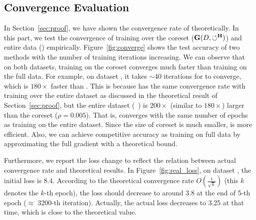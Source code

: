 \vspace{-0.5em}
\subsection{Convergence Evaluation}

In Section~\ref{sec:proof}, we have shown  the convergence rate of \ours theoretically. In this part, we test the convergence of training over the coreset ($\mathbf{G}(D,\circlearrowleft^\mathbf{H})$) and entire data (\truth) empirically.  Figure~\ref{fig:converge} shows the test accuracy of two methods with the number of training iterations increasing. We can observe that on both datasets, training on the coreset converges much faster than training on the full data. 
For example, on dataset \adult, it takes $\sim$40 iterations for \ours to converge, which is  $180\times$ faster than {\truth}. This is because \ours has the same convergence rate with training over the entire dataset as discussed in the theoretical result of Section~\ref{sec:proof}, but the entire dataset (\eg  ~\adult) is $200\times$ (similar to $180\times$) larger than the coreset ($\rho=0.005$).
 That is, \ours converges with the same number of epochs  as training on the entire dataset. Since the size of coreset is much smaller, \ours is more efficient. Also, we can achieve competitive accuracy as training on full data by approximating the full gradient with a theoretical bound. 
 

Furthermore, we report the loss change to reflect the relation between  actual convergence rate and theoretical results. In Figure~\ref{fig:real_loss}, on dataset \adult,  the initial loss is 8.4. According to the theoretical convergence rate $O(\frac{1}{\sqrt{k}})$ (this $k$ denotes the $k$-th epoch),  the loss should decrease to around 3.8 at the end of 5-th epoch ($\approx$ 3200-th iteration). Actually,  the  actual loss decreases to 3.25 at that time, which is close to the theoretical value.

